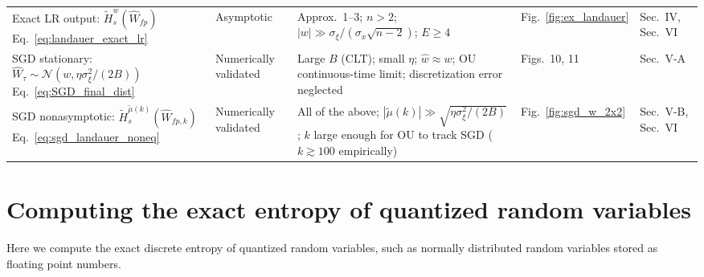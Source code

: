 \documentclass[12pt,onecolumn, margin=1in]{IEEEtran}
\newcommand{\Wh}{\hat{W}}
\newcommand{\wh}{\hat{w}}
\newcommand{\sigx}{\sigma_x}
\newcommand{\sigxi}{\sigma_\xi}
\begin{document}
\begin{table}[htbp]
\begin{tabular}{p{3.0cm} p{1.6cm} p{3.6cm} p{2.4cm} p{2.4cm}}
\addlinespace
Exact LR output: $\tilde H_s^w(\Wh_{fp})$ \newline Eq.~\eqref{eq:landauer_exact_lr} & Asymptotic & Approx.~1--3; $n > 2$; $|w| \gg \sigxi/(\sigx\sqrt{n-2})$; $E \geq 4$ & Fig.~\ref{fig:ex_landauer} & Sec.~IV, Sec.~VI \\
\addlinespace
SGD stationary: $\Wh_\tau \sim \mathcal{N}(w, \eta\sigxi^2/(2B))$ \newline Eq.~\eqref{eq:SGD_final_dist} & Numerically validated & Large $B$ (CLT); small $\eta$; $\wh \approx w$; OU continuous-time limit; discretization error neglected & Figs.~10, 11 & Sec.~V-A \\
\addlinespace
SGD nonasymptotic: $\tilde H_s^{\tilde\mu(k)}(\Wh_{fp,k})$ \newline Eq.~\eqref{eq:sgd_landauer_noneq} & Numerically validated & All of the above; $|\tilde\mu(k)| \gg \sqrt{\eta\sigxi^2/(2B)}$; $k$ large enough for OU to track SGD ($k \gtrsim 100$ empirically) & Fig.~\ref{fig:sgd_w_2x2} & Sec.~V-B, Sec.~VI \\
\bottomrule
\end{tabular}
\end{table}

\FloatBarrier
\pagebreak
\section{Computing the exact entropy of quantized random variables}\label{app:exact_entropy_float}

Here we compute the exact discrete entropy of quantized random variables, such as normally distributed random variables stored as floating point numbers.
\end{document}
